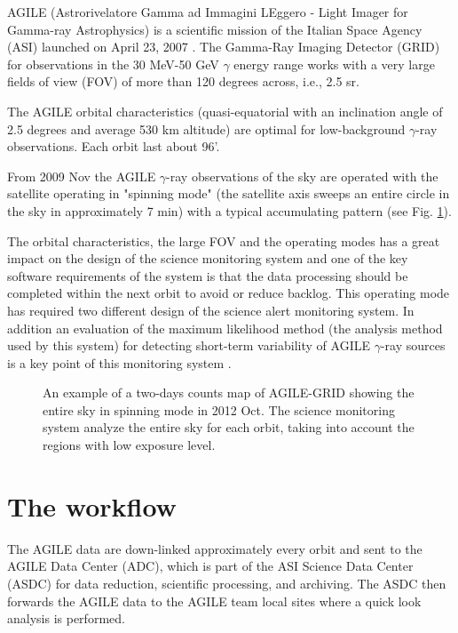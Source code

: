           
          AGILE (Astrorivelatore Gamma ad Immagini LEggero - Light Imager
      for Gamma-ray Astrophysics) is a scientific mission of the
      Italian Space Agency (ASI) launched on April 23, 2007 \citep{Tavani:2009ht}.
      The Gamma-Ray Imaging Detector
      (GRID) for observations in the 30 MeV-50 GeV $\gamma$ energy range works with a very
      large fields of view (FOV) of more than 120 degrees across, i.e.,
      2.5 sr.
      
      
 The AGILE orbital characteristics (quasi-equatorial with an
      inclination angle of 2.5 degrees and average 530 km altitude) are
      optimal for low-background  $\gamma$-ray observations. Each orbit last
      about 96'.
        
      From 2009 Nov the AGILE $\gamma$-ray observations of the sky are operated  with the
          satellite operating in "spinning mode" (the satellite axis sweeps an entire circle in the
          sky in approximately 7 min) with a typical
          accumulating pattern (see Fig. \ref{fig_fov}).            
                    
The orbital characteristics, the large FOV and the operating modes has a great impact on the
      design of the science monitoring system and one of the key
      software requirements of the system is that the data processing
      should be completed within the next orbit to avoid or reduce backlog. This operating mode has required two different design of the science alert monitoring system. In addition an evaluation of the maximum likelihood method (the analysis method used by this system) for detecting short-term variability of AGILE $\gamma$-ray sources is a key point of this monitoring system \citep{Bulgarelli:2012ds}.
                   
\begin{figure}[t]
\caption{An example of a two-days counts map of AGILE-GRID showing the entire sky in spinning mode in 2012 Oct. The science monitoring system analyze the entire sky for each orbit, taking into account the regions with low exposure level.} \label{fig_fov}
\end{figure}

\section{The workflow}

The AGILE data are down-linked approximately every orbit and sent
      to the AGILE Data Center (ADC), which is part of the ASI Science
      Data Center (ASDC) for data reduction, scientific processing,
      and archiving. The ASDC then forwards the AGILE data to the AGILE
      team local sites where a quick look analysis is performed.
    
